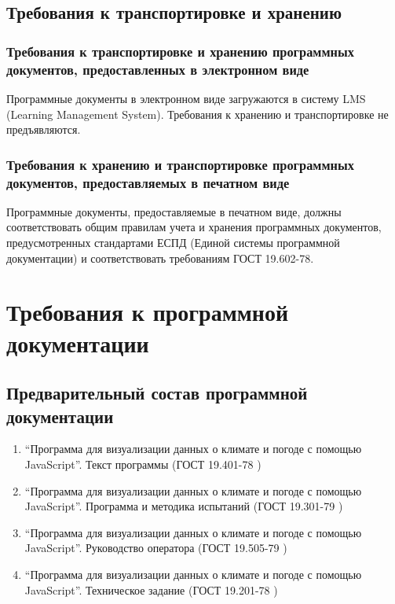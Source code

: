 \documentclass[a4paper, 12pt]{article}
\begin{document}
	\subsection{Требования к транспортировке и хранению}\label{section:4.7}

	\subsubsection{Требования к транспортировке и хранению программных документов, предоставленных в электронном виде}\label{section:4.7.1}
	Программные документы в электронном виде загружаются в систему LMS (Learning Management System). Требования к хранению
	и транспортировке не предъявляются.

	\subsubsection{Требования к хранению и транспортировке программных документов, предоставляемых в печатном виде}\label{section:4.7.2}
	Программные документы, предоставляемые в печатном виде, должны соответствовать общим правилам учета и хранения
	программных документов, предусмотренных стандартами ЕСПД (Единой системы программной документации) и соответствовать требованиям
	ГОСТ 19.602-78.

	\section{Требования к программной документации}\label{section:5}

	\subsection{Предварительный состав программной документации}
	\label{section:5.1}
	\begin{enumerate}
		\item \enquote{Программа для визуализации данных о климате и погоде с помощью JavaScript}. Текст программы (ГОСТ
			19.401-78 \cite{GOST_19.401-78})

		\item \enquote{Программа для визуализации данных о климате и погоде с помощью JavaScript}. Программа и методика испытаний
			(ГОСТ 19.301-79 \cite{GOST_19.301-79})

		\item \enquote{Программа для визуализации данных о климате и погоде с помощью JavaScript}. Руководство оператора (ГОСТ
			19.505-79 \cite{GOST_19.505-79})

		\item \enquote{Программа для визуализации данных о климате и погоде с помощью JavaScript}. Техническое задание (ГОСТ
			19.201-78 \cite{GOST_19.201-78})
	\end{enumerate}
\end{document}
